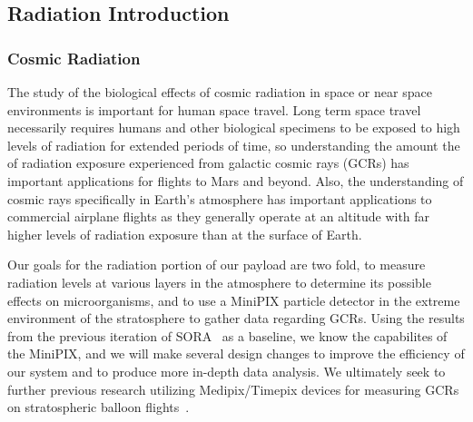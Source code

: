 \subsection{Radiation Introduction}
\label{sec: Radiation Background}

\subsubsection{Cosmic Radiation}
The study of the biological effects of cosmic radiation in space or near space environments is important for human space travel. Long term space travel necessarily requires humans and other biological specimens to be exposed to high levels of radiation for extended periods of time, so understanding the amount the of radiation exposure experienced from galactic cosmic rays (GCRs) has important applications for flights to Mars and beyond. Also, the understanding of cosmic rays specifically in Earth's atmosphere has important applications to commercial airplane flights as they generally operate at an altitude with far higher levels of radiation exposure than at the surface of Earth. 

Our goals for the radiation portion of our payload are two fold, to measure radiation levels at various layers in the atmosphere to determine its possible effects on microorganisms, and to use a MiniPIX particle detector in the extreme environment of the stratosphere to gather data regarding GCRs. Using the results from the previous iteration of SORA~\cite{SORA} as a baseline, we know the capabilites of the MiniPIX, and we will make several design changes to improve the efficiency of our system and to produce more in-depth data analysis. We ultimately seek to further previous research utilizing Medipix/Timepix devices for measuring GCRs on stratospheric balloon flights~\cite{bexus}. 



%
%




